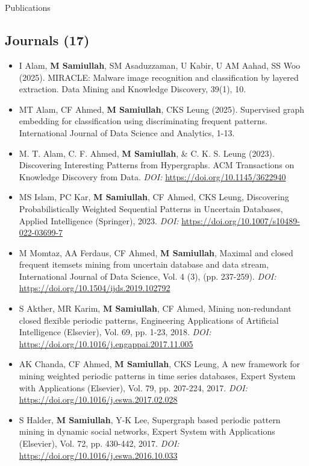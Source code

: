 \section{\faPrint}{Publications}
\subsection{Journals (17)}
\begin{itemize}[noitemsep]
    \item I Alam, \textbf{M Samiullah}, SM Asaduzzaman, U Kabir, U AM Aahad,  SS Woo (2025). MIRACLE: Malware image recognition and classification by layered extraction. Data Mining and Knowledge Discovery, 39(1), 10.
    \item MT Alam, CF Ahmed, \textbf{M Samiullah}, CKS Leung (2025). Supervised graph embedding for classification using discriminating frequent patterns. International Journal of Data Science and Analytics, 1-13.
    \item M. T. Alam, C. F. Ahmed, \textbf{M Samiullah}, \& C. K. S. Leung (2023). Discovering Interesting Patterns from Hypergraphs. ACM Transactions on Knowledge Discovery from Data. {\em DOI:} \url{https://doi.org/10.1145/3622940}
    \item MS Islam, PC Kar, \textbf{M Samiullah}, CF Ahmed, CKS Leung, Discovering Probabilistically Weighted Sequential Patterns in Uncertain Databases, Applied Intelligence (Springer),  2023. {\em DOI:} \url{https://doi.org/10.1007/s10489-022-03699-7}
    \item M Momtaz, AA Ferdaus, CF Ahmed, {\bf M Samiullah}, Maximal and closed frequent itemsets mining from uncertain database and data stream, International Journal of Data Science, Vol. 4 (3), (pp. 237-259). {\em DOI:} \url{https://doi.org/10.1504/ijds.2019.102792}
    \item S Akther, MR Karim, \textbf{M Samiullah}, CF Ahmed, Mining non-redundant closed flexible periodic patterns, Engineering Applications of Artificial Intelligence (Elsevier), Vol. 69, pp. 1-23,  2018. {\em DOI:} \url{https://doi.org/10.1016/j.engappai.2017.11.005}
    \item AK Chanda, CF Ahmed, \textbf{M Samiullah}, CKS Leung, A new framework for mining weighted periodic patterns in time series databases, Expert System with Applications (Elsevier), Vol. 79, pp. 207-224, 2017. {\em DOI:} \url{https://doi.org/10.1016/j.eswa.2017.02.028}
    \item S Halder, \textbf{M Samiullah}, Y-K Lee, Supergraph based periodic pattern mining in dynamic social networks, Expert System with Applications (Elsevier), Vol. 72, pp. 430-442,  2017. {\em DOI:} \url{https://doi.org/10.1016/j.eswa.2016.10.033}

\end{itemize}
